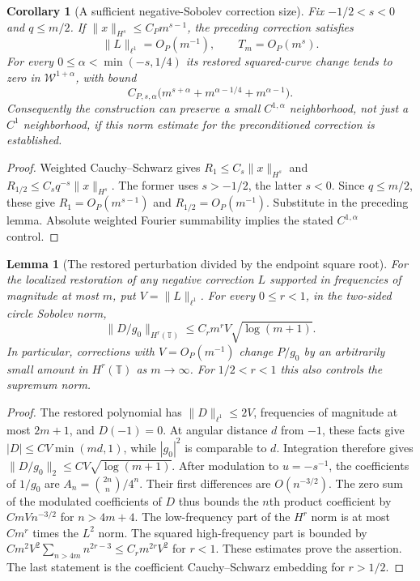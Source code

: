 \documentclass[11pt]{article}
\newtheorem{lemma}[proposition]{Lemma}
\newtheorem{corollary}[proposition]{Corollary}
\newcommand{\T}{\mathbb T}
\begin{document}
\begin{corollary}[A sufficient negative-Sobolev correction size]
\label{cor:negative-sobolev-correction}
Fix $-1/2<s<0$ and $q\le m/2$. If
$\|x\|_{H^s}\le C_Pm^{s-1}$, the preceding correction satisfies
\[
 \|L\|_{\ell^1}=O_P(m^{-1}),\qquad T_m=O_P(m^s).
\]
For every $0\le\alpha<\min(-s,1/4)$ its restored squared-curve
change tends to zero in $\mathcal W^{1+\alpha}$, with bound
\[
 C_{P,s,\alpha}
       \bigl(m^{s+\alpha}+m^{\alpha-1/4}+m^{\alpha-1}\bigr).
\]
Consequently the construction can preserve a small $C^{1,\alpha}$
neighborhood, not just a $C^1$ neighborhood, if this norm estimate
for the preconditioned correction is established.
\end{corollary}
\begin{proof}
Weighted Cauchy--Schwarz gives
$R_1\le C_s\|x\|_{H^s}$ and
$R_{1/2}\le C_s q^{-s}\|x\|_{H^s}$.
The former uses $s>-1/2$, the latter $s<0$.
Since $q\le m/2$, these give $R_1=O_P(m^{s-1})$ and
$R_{1/2}=O_P(m^{-1})$. Substitute in the preceding lemma.
Absolute weighted Fourier summability implies the stated
$C^{1,\alpha}$ control.
\end{proof}


\begin{lemma}[The restored perturbation divided by the endpoint square root]
\label{lem:normalized-endpoint-restoration}
For the localized restoration of any negative correction $L$ supported
in frequencies of magnitude at most $m$, put $V=\|L\|_{\ell^1}$.
For every $0\le r<1$, in the two-sided circle Sobolev norm,
\[
 \|D/g_0\|_{H^r(\T)}
       \le C_r m^r V\sqrt{\log(m+1)}.
\]
In particular, corrections with $V=O_P(m^{-1})$ change $P/g_0$
by an arbitrarily small amount in $H^r(\T)$ as $m\to\infty$.
For $1/2<r<1$ this also controls the supremum norm.
\end{lemma}
\begin{proof}
The restored polynomial has $\|D\|_{\ell^1}\le2V$, frequencies
of magnitude at most $2m+1$, and $D(-1)=0$. At angular distance $d$
from $-1$, these facts give
$|D|\le CV\min(md,1)$, while $|g_0|^2$ is comparable to $d$.
Integration therefore gives
$\|D/g_0\|_2\le CV\sqrt{\log(m+1)}$.
After modulation to $u=-s^{-1}$, the coefficients of $1/g_0$ are
$A_n=\binom{2n}{n}/4^n$. Their first differences are $O(n^{-3/2})$.
The zero sum of the modulated coefficients of $D$ thus bounds the
$n$th product coefficient by $CmVn^{-3/2}$ for $n>4m+4$.
The low-frequency part of the $H^r$ norm is at most $Cm^r$ times
the $L^2$ norm. The squared high-frequency part is bounded by
$C m^2V^2\sum_{n>4m}n^{2r-3}\le C_rm^{2r}V^2$ for $r<1$.
These estimates prove the assertion. The last statement is the
coefficient Cauchy--Schwarz embedding for $r>1/2$.
\end{proof}
\end{document}
